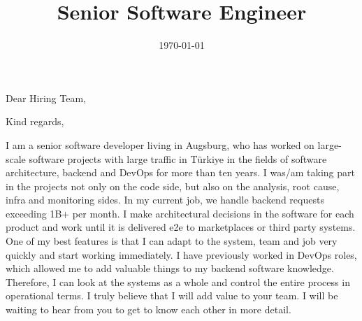 \documentclass[11pt,a4paper,sans]{moderncv}
\title{Senior Software Engineer}
\begin{document}
\recipient{}{}
\date{\today}
\opening{Dear Hiring Team,}
\closing{Kind regards,}
\makelettertitle

I am a senior software developer living in Augsburg, who has worked on large-scale software projects with large traffic in T\"urkiye in the fields of software architecture, backend and DevOps for more than ten years. I was/am taking part in the projects not only on the code side, but also on the analysis, root cause, infra and monitoring sides. In my current job, we handle backend requests exceeding 1B+ per month. I make architectural decisions in the software for each product and work until it is delivered e2e to marketplaces or third party systems. One of my best features is that I can adapt to the system, team and job very quickly and start working immediately. I have previously worked in DevOps roles, which allowed me to add valuable things to my backend software knowledge. Therefore, I can look at the systems as a whole and control the entire process in operational terms. I truly believe that I will add value to your team. I will be waiting to hear from you to get to know each other in more detail.

\makeletterclosing
\end{document}
